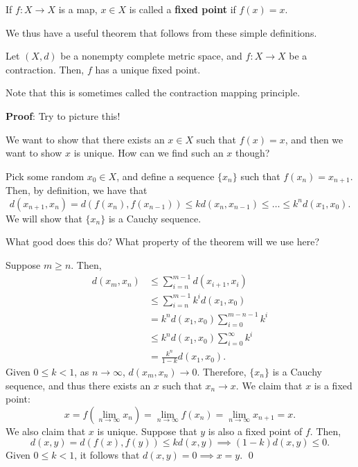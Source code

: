 \begin{definition}
If $f: X\to X$ is a map, $x\in X$ is called a \textbf{fixed point} if $f(x) = x$.
\end{definition}

We thus have a useful theorem that follows from these simple definitions.
\begin{theorem}
Let $(X,d)$ be a nonempty complete metric space, and $f:X\to X$ be a contraction. Then, $f$ has a unique fixed point.
\end{theorem}

\begin{remark}
    Note that this is sometimes called the contraction mapping principle. 
\end{remark}

\noindent \textbf{Proof}: Try to picture this!

We want to show that there exists an $x\in X$ such that $f(x) = x$, and then we want to show $x$ is unique. How can we find such an $x$ though?

Pick some random $x_0\in X$, and define a sequence $\{x_n\}$ such that $f(x_n) = x_{n+1}$. Then, by definition, we have that 
\[
d(x_{n+1}, x_n) = d(f(x_n), f(x_{n-1})) \leq k d(x_{n}, x_{n-1}) \leq \dots \leq k^n d(x_1, x_0).
\]
We will show that $\{x_n\}$ is a Cauchy sequence.

\begin{question}
What good does this do? What property of the theorem will we use here?
\end{question}

Suppose $m\geq n$. Then, 
\begin{align*}
    d(x_m,x_n) &\leq \sum_{i=n}^{m-1} d(x_{i+1}, x_i) \\
    &\leq \sum_{i=n}^{m-1} k^i d(x_1,x_0) \\
    &= k^n d(x_1, x_0) \sum_{i=0}^{m-n-1}k^i \\
    &\leq k^n d(x_1, x_0)\sum_{i=0}^\infty k^i\\
    &= \frac{k^n}{1-k} d(x_1, x_0). 
\end{align*}
Given $0 \leq k < 1$, as $n\to \infty$, $d(x_m, x_n) \to 0.$ Therefore, $\{x_n\}$ is a Cauchy sequence, and thus there exists an $x$ such that $x_n \to x$. We claim that $x$ is a fixed point: 
\[
x = f(\lim_{n\to \infty}x_n) = \lim_{n\to \infty} f(x_n) = \lim_{n\to \infty} x_{n+1} = x.
\]
We also claim that $x$ is unique. Suppose that $y$ is also a fixed point of $f$. Then, 
\[
d(x,y) = d(f(x), f(y)) \leq k d(x,y)\implies (1-k)d(x,y) \leq 0.
\]
Given $0\leq k < 1$, it follows that $d(x,y) = 0 \implies x=y$. \qed 

